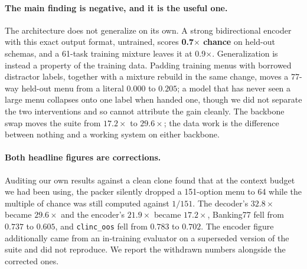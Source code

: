 \paragraph{The main finding is negative, and it is the useful one.} The
architecture does not generalize on its own. A strong bidirectional encoder
with this exact output format, untrained, scores \textbf{0.7$\times$
chance} on held-out schemas, and a 61-task training mixture leaves it at
0.9$\times$. Generalization is instead a property of the training data.
Padding training menus with borrowed distractor labels, together with a
mixture rebuild in the same change, moves a 77-way held-out menu from a
literal $0.000$ to $0.205$; a model that has never seen a large menu
collapses onto one label when handed one, though we did not separate the
two interventions and so cannot attribute the gain cleanly. The backbone
swap moves the suite from $17.2\times$ to $29.6\times$; the data work is
the difference between nothing and a working system on either backbone.

\paragraph{Both headline figures are corrections.} Auditing our own results
against a clean clone found that at the context budget we had been using,
the packer silently dropped a 151-option menu to 64 while the multiple of
chance was still computed against $1/151$. The decoder's $32.8\times$
became $29.6\times$ and the encoder's $21.9\times$ became $17.2\times$,
Banking77 fell from $0.737$ to $0.605$, and \texttt{clinc\_oos} fell from
$0.783$ to $0.702$. The encoder figure additionally came from an
in-training evaluator on a superseded version of the suite and did not
reproduce. We report the withdrawn numbers alongside the corrected ones.


